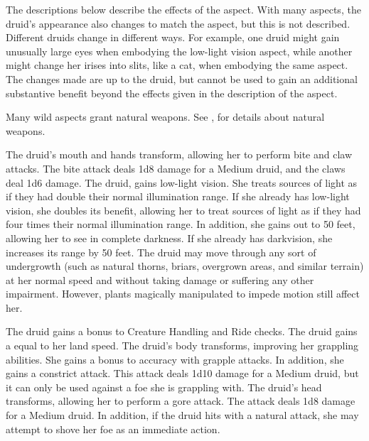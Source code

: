         The descriptions below describe the effects of the aspect.
        With many aspects, the druid's appearance also changes to match the aspect, but this is not described.
        Different druids change in different ways.
        For example, one druid might gain unusually large eyes when embodying the low-light vision aspect, while another might change her irises into slits, like a cat, when embodying the same aspect.
        The changes made are up to the druid, but cannot be used to gain an additional substantive benefit beyond the effects given in the description of the aspect.

        Many wild aspects grant natural weapons.
        See , for details about natural weapons.

        The druid's mouth and hands transform, allowing her to perform bite and claw attacks.
        The bite attack deals 1d8 damage for a Medium druid, and the claws deal 1d6 damage.
        The druid, gains low-light vision.
        She treats sources of light as if they had double their normal illumination range.
        If she already has low-light vision, she doubles its benefit, allowing her to treat sources of light as if they had four times their normal illumination range.
        In addition, she gains  out to 50 feet, allowing her to see in complete darkness.
        If she already has darkvision, she increases its range by 50 feet.
        The druid may move through any sort of undergrowth (such as natural thorns, briars, overgrown areas, and similar terrain) at her normal speed and without taking damage or suffering any other impairment.
        However, plants magically manipulated to impede motion still affect her.

        The druid gains a  bonus to Creature Handling and Ride checks.
        The druid gains a  equal to her land speed.
        The druid's body transforms, improving her grappling abilities.
        She gains a  bonus to accuracy with grapple attacks.
        In addition, she gains a constrict attack.
        This attack deals 1d10 damage for a Medium druid, but it can only be used against a foe she is grappling with.
        The druid's head transforms, allowing her to perform a gore attack.
        The attack deals 1d8 damage for a Medium druid.
        In addition, if the druid hits with a natural attack, she may attempt to shove her foe as an immediate action.


